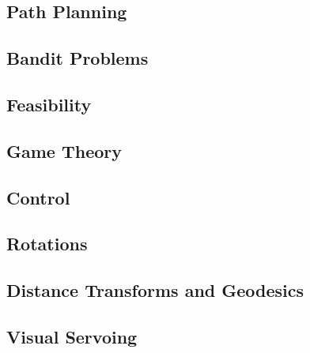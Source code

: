 \subsection{Path Planning}

\subsection{Bandit Problems}

\subsection{Feasibility}

\subsection{Game Theory}

\subsection{Control}

\subsection{Rotations}

\subsection{Distance Transforms and Geodesics}

\subsection{Visual Servoing}
